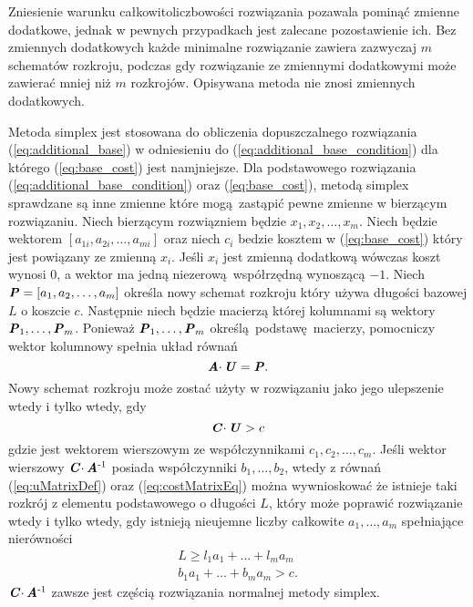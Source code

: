 Zniesienie warunku całkowitoliczbowości rozwiązania pozawala pominąć zmienne dodatkowe, jednak w pewnych przypadkach jest zalecane pozostawienie ich. Bez zmiennych dodatkowych każde minimalne rozwiązanie zawiera zazwyczaj $m$ schematów rozkroju, podczas gdy rozwiązanie ze zmiennymi dodatkowymi może zawierać mniej niż $m$ rozkrojów. Opisywana metoda nie znosi zmiennych dodatkowych.

Metoda simplex jest stosowana do obliczenia dopuszczalnego rozwiązania (\ref{eq:additional_base}) w odniesieniu do (\ref{eq:additional_base_condition}) dla którego (\ref{eq:base_cost}) jest namjniejsze. Dla podstawowego rozwiązania (\ref{eq:additional_base_condition}) oraz (\ref{eq:base_cost}), metodą simplex sprawdzane są inne zmienne które mogą zastąpić pewne zmienne w bierzącym rozwiązaniu. Niech bierzącym rozwiązniem będzie $x_1,x_2,\dots,x_m$. Niech  będzie wektorem $[a_{1i}, a_{2i}, \dots, a_{mi}]$ oraz niech $c_i$ bedzie kosztem w (\ref{eq:base_cost}) który jest powiązany ze zmienną $x_i$. Jeśli $x_i$ jest zmienną dodatkową wówczas koszt wynosi $0$, a wektor ma jedną niezerową współrzędną wynoszącą $-1$. Niech $\textbf{\textit{P}} = [a_1,a_2,\dots,a_m]$ określa nowy schemat rozkroju który używa długości bazowej $L$ o koszcie $c$. Następnie niech  będzie macierzą której kolumnami są wektory $\textbf{\textit{P}}_1,\dots,\textbf{\textit{P}}_m$. Ponieważ $\textbf{\textit{P}}_1, \dots, \textbf{\textit{P}}_m$ określą podstawę macierzy, pomocniczy wektor kolumnowy  spełnia układ równań
\begin{equation}\label{eq:uMatrixDef}
  \textbf{\textit{A}} \cdotp \textbf{\textit{U}} = \textbf{\textit{P}}.
\end{equation}
Nowy schemat rozkroju może zostać użyty w rozwiązaniu jako jego ulepszenie wtedy i tylko wtedy, gdy
\begin{equation}\label{eq:costMatrixEq}
  \textbf{\textit{C}} \cdotp \textbf{\textit{U}} > c
\end{equation}
gdzie  jest wektorem wierszowym ze współczynnikami $c_1,c_2,\dots,c_m$. Jeśli wektor wierszowy $\textbf{\textit{C}} \cdotp \textbf{\textit{A}}\textsuperscript{-1}$ posiada współczynniki $b_1,\dots,b_2$, wtedy z równań (\ref{eq:uMatrixDef}) oraz (\ref{eq:costMatrixEq}) można wywnioskować że istnieje taki rozkrój z elementu podstawowego o długości $L$, który może poprawić rozwiązanie wtedy i tylko wtedy, gdy istnieją nieujemne liczby całkowite $a_1,\dots,a_m$ spełniające nierówności
\begin{align}
L \ge l_1a_1+\dots+l_ma_m \label{length_eq} \\
b_1a_1+\dots+b_ma_m > c. \label{cost_eq}
\end{align}
$\textbf{\textit{C}} \cdotp \textbf{\textit{A}}\textsuperscript{-1}$ zawsze jest częścią rozwiązania normalnej metody simplex.

